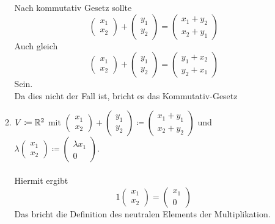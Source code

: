 \documentclass{HM}
\begin{document}
\begin{enumerate}
\begin{enumerate}
Nach kommutativ Gesetz sollte $$\begin{pmatrix}x_1\\x_2\end{pmatrix}+
\begin{pmatrix}y_1\\y_2\end{pmatrix}=
\begin{pmatrix}x_1+y_2\\x_2+y_1\end{pmatrix}$$
Auch gleich
$$\begin{pmatrix}x_1\\x_2\end{pmatrix}+
\begin{pmatrix}y_1\\y_2\end{pmatrix}=
\begin{pmatrix}y_1+x_2\\y_2+x_1\end{pmatrix}$$
Sein.\\
Da dies nicht der Fall ist, bricht es das Kommutativ-Gesetz\\
\item $V\coloneqq\mathbb{R}^2$ mit $\begin{pmatrix}
x_1\\
x_2
\end{pmatrix}+\begin{pmatrix}
y_1\\
y_2
\end{pmatrix}\coloneqq\begin{pmatrix}
x_1+y_1\\
x_2+y_2
\end{pmatrix}$ und $\lambda\begin{pmatrix}
x_1\\
x_2
\end{pmatrix}\coloneqq\begin{pmatrix}
\lambda x_1\\
0
\end{pmatrix}$.\\\\
Hiermit ergibt
$$1\begin{pmatrix}x_1\\x_2\end{pmatrix}=
\begin{pmatrix}x_1\\0\end{pmatrix}$$
Das bricht die Definition des neutralen Elements der Multiplikation.
\\

\end{enumerate}
\end{enumerate}
\end{document}
